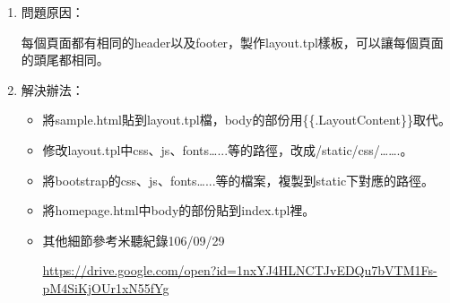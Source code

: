 
\begin{enumerate}
	\item 問題原因：
	
	每個頁面都有相同的header以及footer，製作layout.tpl樣板，可以讓每個頁面的頭尾都相同。	
	
	\item 解決辦法：
	
	\begin{itemize}
		\item 將sample.html貼到layout.tpl檔，body的部份用\{\{.LayoutContent\}\}取代。
				
		\item 修改layout.tpl中css、js、fonts…...等的路徑，改成/static/css/…….。
		
		\item 將bootstrap的css、js、fonts…...等的檔案，複製到static下對應的路徑。
		
		\item 將homepage.html中body的部份貼到index.tpl裡。
		
		\item 其他細節參考米聽紀錄106/09/29
		
		\url{https://drive.google.com/open?id=1nxYJ4HLNCTJvEDQu7bVTM1Fs-pM4SiKjOUr1xN55fYg}
		
	\end{itemize}
\end{enumerate}




